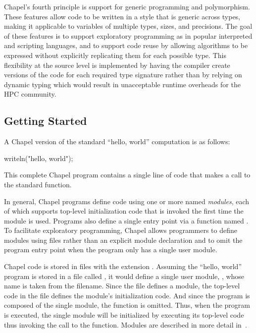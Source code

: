 Chapel's fourth principle is support for generic programming and
polymorphism.  These features allow code to be written in a style that
is generic across types, making it applicable to variables of multiple
types, sizes, and precisions.  The goal of these features is to
support exploratory programming as in popular interpreted and
scripting languages, and to support code reuse by allowing algorithms
to be expressed without explicitly replicating them for each possible
type.  This flexibility at the source level is implemented by having
the compiler create versions of the code for each required type
signature rather than by relying on dynamic typing which would result
in unacceptable runtime overheads for the HPC community.

\subsection{Getting Started}

A Chapel version of the standard ``hello, world'' computation is as
follows:
\vspace{0.5pc}
\begin{chapel}
writeln("hello, world");
\end{chapel}
This complete Chapel program contains a single line of code that makes
a call to the standard  function.


In general, Chapel programs define code using one or more named
\emph{modules}, each of which supports top-level initialization code
that is invoked the first time the module is used.  Programs also
define a single entry point via a function named .  To
facilitate exploratory programming, Chapel allows programmers to
define modules using files rather than an explicit module declaration
and to omit the program entry point when the program only has a single
user module.

Chapel code is stored in files with the extension .
Assuming the ``hello, world'' program is stored in a file
called , it would define a single user
module, , whose name is taken from the filename.  Since
the file defines a module, the top-level code in the file defines the
module's initialization code.  And since the program is composed of
the single  module, the  function is omitted.
Thus, when the program is executed, the single  module
will be initialized by executing its top-level code thus invoking the
call to the  function.  Modules are described in more
detail in~.

